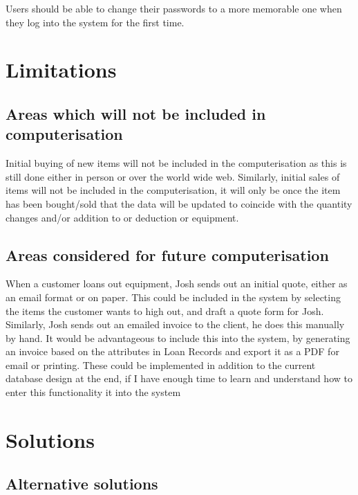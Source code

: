 \noindent Users should be able to change their passwords to a more memorable one when they log into the system for the first time.

\section{Limitations}

\subsection{Areas which will not be included in computerisation}

Initial buying of new items will not be included in the computerisation as this is still done either in person or over the world wide web. Similarly, initial sales of items will not be included in the computerisation, it will only be once the item has been bought/sold that the data will be updated to coincide with the quantity changes and/or addition to or deduction or equipment.

\subsection{Areas considered for future computerisation}

When a customer loans out equipment, Josh sends out an initial quote, either as an email format or on paper. This could be included in the system by selecting the items the customer wants to high out, and draft a quote form for Josh. Similarly, Josh sends out an emailed invoice to the client, he does this manually by hand. It would be advantageous to include this into the system, by generating an invoice based on the attributes in Loan Records and export it as a PDF for email or printing. These could be implemented in addition to the current database design at the end, if I have enough time to learn and understand how to enter this functionality it into the system

\section{Solutions}

\subsection{Alternative solutions}

